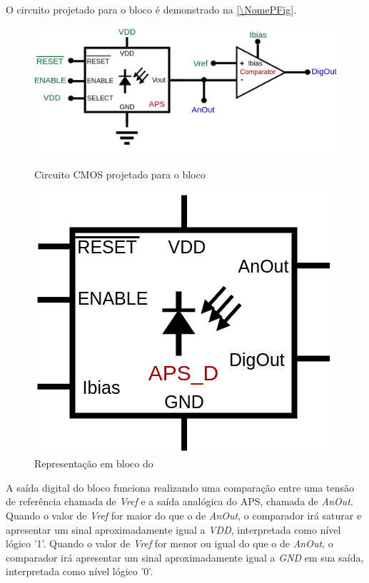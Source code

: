 O circuito projetado para o bloco \'e demonstrado na \autoref{\NomePFig}.

\begin{figure}[htb]
 \centering
    \centering
    \caption{Circuito CMOS projetado para o bloco \NomeBloco} 
    \includegraphics[scale=0.3]{Circuitos/APS_digitalized.png}
    \label{\NomePFig}
\end{figure}

\begin{figure}[htb]
 \centering
    \centering
    \caption{Representa{\c c}\~ao em bloco do \NomeBloco} \label{\NomeSFig}
    \includegraphics[scale=0.3]{Circuitos/APS_digitalized_block.png}
\end{figure}

A sa\'ida digital do bloco funciona realizando uma compara{\c c}\~ao entre uma tens\~ao de refer\^encia chamada de \emph{Vref} e a sa\'ida anal\'ogica do APS, chamada de \emph{AnOut}. Quando o valor de \emph{Vref} for maior do que o de \emph{AnOut}, o comparador ir\'a saturar e apresentar um sinal aproximadamente igual a \emph{VDD}, interpretada como n\'ivel l\'ogico '1'. Quando o valor de \emph{Vref} for menor ou igual do que o de \emph{AnOut}, o comparador ir\'a apresentar um sinal aproximadamente igual a \emph{GND} em sua sa\'ida, interpretada como n\'ivel l\'ogico '0'.

